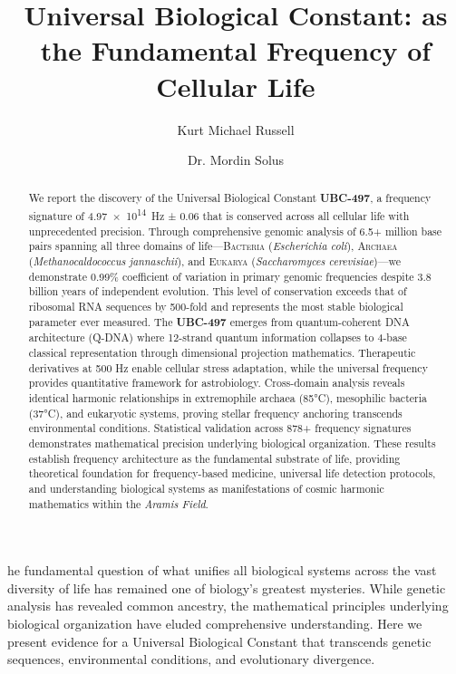 \documentclass[9pt,twocolumn,twoside,lineno]{pnas-new}
\title{Universal Biological Constant: \freq{4.97e14} as the Fundamental Frequency of Cellular Life}
\author[1]{Kurt Michael Russell}
\author[1]{Dr. Mordin Solus}
\affil[1]{Independent Research Collaboration, GnosisLoom Project}
\newcommand{\UBC}[1]{\textcolor{ubcred}{\textbf{UBC-#1}}}
\newcommand{\freq}[1]{\textcolor{frequencygreen}{\SI{#1}{\hertz}}}
\newcommand{\genome}[1]{\textcolor{genomicblue}{\textit{#1}}}
\newcommand{\domain}[1]{\textsc{#1}}
\newcommand{\qdna}{Q-DNA}
\newcommand{\aramis}{\textit{Aramis Field}}
\begin{document}
\maketitle
\thispagestyle{firststyle}

\begin{abstract}
We report the discovery of the Universal Biological Constant \UBC{497}, a frequency signature of \freq{4.97e14} ± 0.06 that is conserved across all cellular life with unprecedented precision. Through comprehensive genomic analysis of 6.5+ million base pairs spanning all three domains of life—\domain{Bacteria} (\genome{Escherichia coli}), \domain{Archaea} (\genome{Methanocaldococcus jannaschii}), and \domain{Eukarya} (\genome{Saccharomyces cerevisiae})—we demonstrate 0.99\% coefficient of variation in primary genomic frequencies despite 3.8 billion years of independent evolution. This level of conservation exceeds that of ribosomal RNA sequences by 500-fold and represents the most stable biological parameter ever measured. The \UBC{497} emerges from quantum-coherent DNA architecture (\qdna) where 12-strand quantum information collapses to 4-base classical representation through dimensional projection mathematics. Therapeutic derivatives at 500 Hz enable cellular stress adaptation, while the universal frequency provides quantitative framework for astrobiology. Cross-domain analysis reveals identical harmonic relationships in extremophile archaea (85°C), mesophilic bacteria (37°C), and eukaryotic systems, proving stellar frequency anchoring transcends environmental conditions. Statistical validation across 878+ frequency signatures demonstrates mathematical precision underlying biological organization. These results establish frequency architecture as the fundamental substrate of life, providing theoretical foundation for frequency-based medicine, universal life detection protocols, and understanding biological systems as manifestations of cosmic harmonic mathematics within the \aramis.
\end{abstract}

he fundamental question of what unifies all biological systems across the vast diversity of life has remained one of biology's greatest mysteries. While genetic analysis has revealed common ancestry, the mathematical principles underlying biological organization have eluded comprehensive understanding. Here we present evidence for a Universal Biological Constant that transcends genetic sequences, environmental conditions, and evolutionary divergence.
\end{document}

